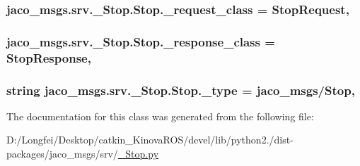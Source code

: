 \subsubsection[{\texorpdfstring{\+\_\+request\+\_\+class}{_request_class}}]{\setlength{\rightskip}{0pt plus 5cm}jaco\+\_\+msgs.\+srv.\+\_\+\+Stop.\+Stop.\+\_\+request\+\_\+class = {\bf Stop\+Request}\hspace{0.3cm}{\ttfamily [static]}, {\ttfamily [private]}}\hypertarget{classjaco__msgs_1_1srv_1_1__Stop_1_1Stop_a758bf662de4bbb2dfc37b20aa47f6513}{}\label{classjaco__msgs_1_1srv_1_1__Stop_1_1Stop_a758bf662de4bbb2dfc37b20aa47f6513}
\subsubsection[{\texorpdfstring{\+\_\+response\+\_\+class}{_response_class}}]{\setlength{\rightskip}{0pt plus 5cm}jaco\+\_\+msgs.\+srv.\+\_\+\+Stop.\+Stop.\+\_\+response\+\_\+class = {\bf Stop\+Response}\hspace{0.3cm}{\ttfamily [static]}, {\ttfamily [private]}}\hypertarget{classjaco__msgs_1_1srv_1_1__Stop_1_1Stop_a899c3301343e452dd9de125a57a64946}{}\label{classjaco__msgs_1_1srv_1_1__Stop_1_1Stop_a899c3301343e452dd9de125a57a64946}
\subsubsection[{\texorpdfstring{\+\_\+type}{_type}}]{\setlength{\rightskip}{0pt plus 5cm}string jaco\+\_\+msgs.\+srv.\+\_\+\+Stop.\+Stop.\+\_\+type = \textquotesingle{}jaco\+\_\+msgs/{\bf Stop}\textquotesingle{}\hspace{0.3cm}{\ttfamily [static]}, {\ttfamily [private]}}\hypertarget{classjaco__msgs_1_1srv_1_1__Stop_1_1Stop_a653645ddd44e8f91e4e6eadd93640916}{}\label{classjaco__msgs_1_1srv_1_1__Stop_1_1Stop_a653645ddd44e8f91e4e6eadd93640916}


The documentation for this class was generated from the following file\+:\begin{DoxyCompactItemize}
\item 
D\+:/\+Longfei/\+Desktop/catkin\+\_\+\+Kinova\+R\+O\+S/devel/lib/python2./dist-\/packages/jaco\+\_\+msgs/srv/\hyperlink{__Stop_8py}{\+\_\+\+Stop.\+py}\end{DoxyCompactItemize}
